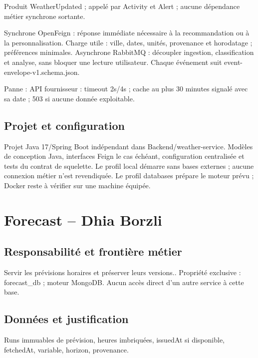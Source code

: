 \documentclass[10pt,a4paper]{article}
\begin{document}
Produit WeatherUpdated ; appelé par Activity et Alert ; aucune dépendance métier synchrone sortante.\par

Synchrone OpenFeign : réponse immédiate nécessaire à la recommandation ou à la personnalisation. Charge utile : ville, dates, unités, provenance et horodatage ; préférences minimales. Asynchrone RabbitMQ : découpler ingestion, classification et analyse, sans bloquer une lecture utilisateur. Chaque événement suit event-envelope-v1.schema.json.\par

Panne : API fournisseur : timeout 2s/4s ; cache au plus 30 minutes signalé avec sa date ; 503 si aucune donnée exploitable.\par

\subsection*{Projet et configuration}

Projet Java 17/Spring Boot indépendant dans Backend/weather-service. Modèles de conception Java, interfaces Feign le cas échéant, configuration centralisée et tests du contrat de squelette. Le profil local démarre sans bases externes ; aucune connexion métier n'est revendiquée. Le profil databases prépare le moteur prévu ; Docker reste à vérifier sur une machine équipée.\par
\clearpage
\section*{Forecast  --  Dhia Borzli}

\subsection*{Responsabilité et frontière métier}

Servir les prévisions horaires et préserver leurs versions.. Propriété exclusive : forecast\_db ; moteur MongoDB. Aucun accès direct d'un autre service à cette base.\par

\subsection*{Données et justification}

Runs immuables de prévision, heures imbriquées, issuedAt si disponible, fetchedAt, variable, horizon, provenance.\par
\end{document}
